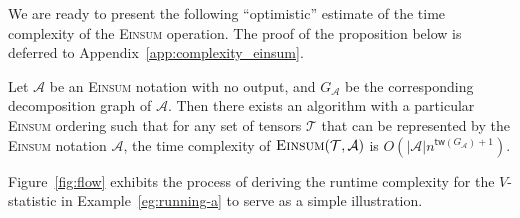 \documentclass[twoside,11pt]{article}
\def\Einsum{\textsc{Einsum}}
\newcommand{\tensorcontraction}{\textsc{Einsum}}
\newcommand{\treewidthp}[1]{\mathsf{tw}(#1)}
\newcommand{\less}{O}
\def\calA{\mathcal{A}}
\def\calT{\mathcal{T}}
\begin{document}
We are ready to present the following ``optimistic'' estimate of the time complexity of the \Einsum{} operation. The proof of the proposition below is deferred to Appendix~\ref{app:complexity_einsum}.

\begin{proposition}
\label{pro:complexity_einsum}
Let $\calA$ be an \Einsum{} notation with no output, and $G_\calA$ be the corresponding decomposition graph of $\calA$. Then there exists an algorithm with a particular \Einsum{} ordering such that for any set of tensors $\calT$ that can be represented by the \Einsum{} notation $\calA$, the time complexity of $\tensorcontraction(\calT, \calA)$ is $\less(|\calA|n^{\treewidthp{G_\calA}+1})$. 
\end{proposition}
 
\iffalse
Figure~\ref{fig:flow} exhibits the process of deriving the runtime complexity for the $V$-statistic in Example~\ref{eg:running-a} to serve as a simple illustration.
\end{document}
